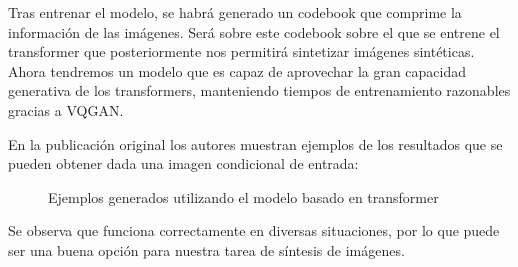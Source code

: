Tras entrenar el modelo, se habrá generado un codebook que comprime la información de las imágenes. Será sobre este codebook sobre el que se entrene el transformer que posteriormente nos permitirá sintetizar imágenes sintéticas. Ahora tendremos un modelo que es capaz de aprovechar la gran capacidad generativa de los transformers, manteniendo tiempos de entrenamiento razonables gracias a VQGAN.

En la publicación original los autores muestran ejemplos de los resultados que se pueden obtener dada una imagen condicional de entrada:

\begin{figure}[H]
\centering
    \caption{Ejemplos generados utilizando el modelo basado en transformer \cite{esser2021taming}}
\end{figure}

Se observa que funciona correctamente en diversas situaciones, por lo que puede ser una buena opción para nuestra tarea de síntesis de imágenes.


